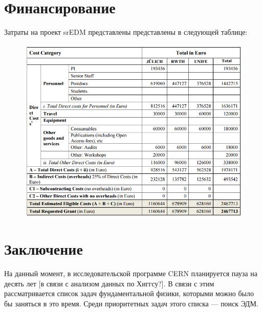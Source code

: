 \documentclass{extarticle}
\begin{document}
\section{Финансирование}
Затраты на проект srEDM представлены представлены в следующей таблице:

\begin{figure}[h]
	\centering
	\includegraphics[scale=.7]{img/Costs_table}
\end{figure}

		
\section*{Заключение}
На данный момент, в исследовательской программе CERN планируется пауза на десять лет [в связи с анализом данных по Хиггсу?]. В связи с этим рассматривается список задач фундаментальной физики, которыми можно было бы заняться в это время. Среди приоритетных задач этого списка --- поиск ЭДМ. 
\end{document}
